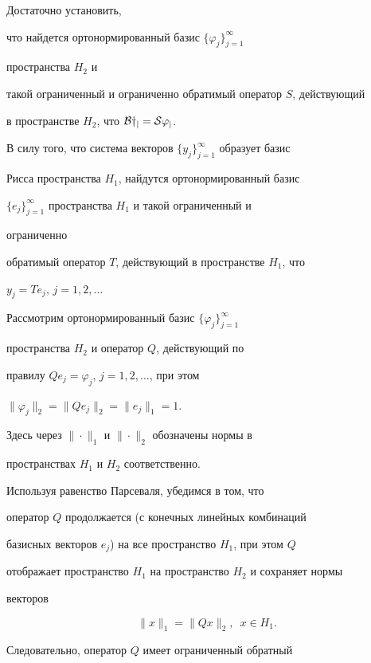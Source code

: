 \begin{pf} 


Достаточно установить, 


что найдется ортонормированный базис $\{\varphi_j\}^\infty_{j=1}$ 


пространства $H_2$ и 


такой ограниченный и ограниченно обратимый оператор $S$, действующий 


в пространстве $H_2$, что $\cal B y_j=S\varphi_j$. 


 


В силу того, что система векторов $\{y_j\}^\infty_{j=1}$ образует базис 


Рисса пространства $H_1$, найдутся ортонормированный базис 


$\{e_j\}^\infty_{j=1}$ пространства $H_1$ и такой ограниченный и 


ограниченно 


обратимый оператор $T$, действующий в пространстве $H_1$, что 


$y_j=T e_j$, $j=1,2,\dotsc$ 


 


Рассмотрим ортонормированный базис $\{\varphi_j\}^\infty_{j=1}$ 


пространства $H_2$ и оператор $Q$, действующий по 


правилу $Q e_j=\varphi_j$, $j=1,2,\dotsc$, при этом 


$\|\varphi_j\|_2=\|Q e_j\|_2=\|e_j\|_1=1$. 


Здесь через $\|\cdot\|_1$ и $\|\cdot\|_2$ обозначены нормы в 


пространствах $H_1$ и $H_2$ соответственно. 


 


Используя равенство Парсеваля, убедимся в том, что 


оператор $Q$ продолжается (с конечных линейных комбинаций 


базисных векторов $e_j$) на все пространство $H_1$, при этом $Q$ 


отображает пространство $H_1$ на пространство $H_2$ и сохраняет нормы 


векторов 


$$ 


\|x\|_1=\|Q x\|_2, \ \; x\in H_1.


$$ 


Следовательно, оператор $Q$ имеет ограниченный обратный 



\end{pf}
